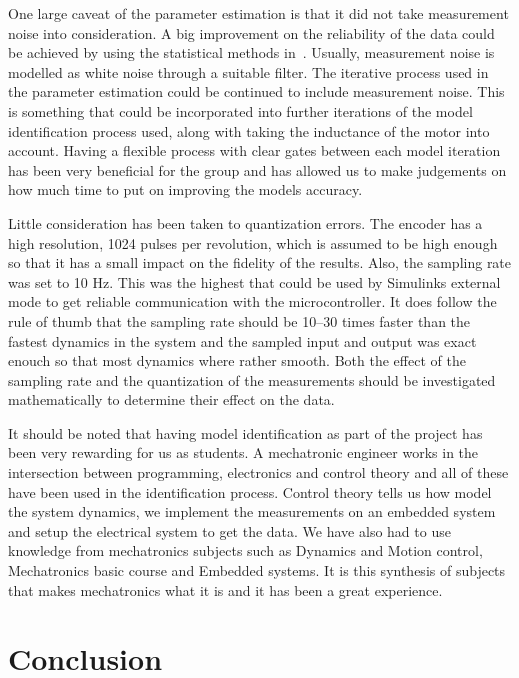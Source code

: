 One large caveat of the parameter estimation is that it did not take measurement
noise into consideration. A big improvement on the reliability of the data could
be achieved by using the statistical methods in~\cite{modeling1994}. Usually,
measurement noise is modelled as white noise through a suitable filter. The
iterative process used in the parameter estimation could be continued to include
measurement noise. This is something that could be incorporated into further
iterations of the model identification process used, along with taking the
inductance of the motor into account. Having a flexible process with clear gates
between each model iteration has been very beneficial for the group and has
allowed us to make judgements on how much time to put on improving the models
accuracy.

Little consideration has been taken to quantization errors. The
encoder has a high resolution, 1024 pulses per revolution, which is assumed to
be high enough so that it has a small impact on the fidelity of the results.
Also, the sampling rate was set to 10 Hz. This was the highest that could be
used by Simulinks external mode to get reliable communication with the
microcontroller. It does follow the rule of thumb that the sampling rate should
be 10--30 times faster than the fastest dynamics in the system and the sampled
input and output was exact enouch so that most dynamics where rather smooth.
Both the effect of the sampling rate and the quantization of the measurements
should be investigated mathematically to determine their effect on the data.

It should be noted that having model identification as part of the project has
been very rewarding for us as students. A mechatronic engineer works in the
intersection between programming, electronics and control theory and all of
these have been used in the identification process. Control theory tells us how
model the system dynamics, we implement the measurements on an embedded system
and setup the electrical system to get the data. We have also had to use
knowledge from mechatronics subjects such as Dynamics and Motion control,
Mechatronics basic course and Embedded systems. It is this synthesis of subjects
that makes mechatronics what it is and it has been a great experience. 
\section{Conclusion}
